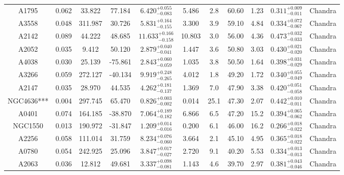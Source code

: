 \documentclass{aa}   %
\begin{document}
\begin{table}[ht!]
\begin{center}
\begin{tabular}{ c  c  c  c c c c c c c c }
A1795               		&		0.062	&	33.822	&	77.184	& $	6.420^{+0.055}_{-0.083}$  &      5.486	&  2.8	&	60.60	&	1.23	&	$ 0.311^{+0.009}_{-0.011}  $ &	  Chandra     \\
A3558               		&		0.048	&	311.987	&	30.726	& $	5.831^{+0.164}_{-0.155}$  &      3.300	&  3.9	&	59.10	&	4.84	&	$ 0.334^{+0.072}_{-0.067}  $ &	 Chandra      \\
A2142               		&		0.089	&	44.222	&	48.685	& $ 11.633^{+0.166}_{-0.158}$ &     10.803	&  3.0	&	56.00	&	4.36	&	$ 0.473^{+0.032}_{-0.033}  $ &	  Chandra     \\
A2052               		&		0.035	&	9.412	&	50.120	& $	2.879^{+0.040}_{-0.041}$  &      1.447	&  3.6	&	50.80	&	3.03	&	$ 0.430^{+0.021}_{-0.020}  $ &	  Chandra     \\
A4038               		&		0.030	&	25.139	&	-75.861	& $	2.843^{+0.060}_{-0.059}$  &      1.035	&  3.8	&	50.50	&	1.64	&	$ 0.398^{+0.031}_{-0.029}  $ &	  Chandra     \\
A3266               		&		0.059	&	272.127	&	-40.134	& $	9.919^{+0.248}_{-0.265}$  &      4.012	&  1.8	&	49.20	&	1.72	&	$ 0.340^{+0.055}_{-0.049}  $ &	  Chandra     \\
A2147               		&		0.035	&	28.970	&	44.535	& $	4.262^{+0.181}_{-0.137}$  &      1.369	&  7.0	&	47.90	&	3.38	&	$ 0.420^{+0.051}_{-0.058}  $ &	  Chandra     \\
NGC4636***          		&		0.004	&	297.745	&	65.470	& $	0.826^{+0.003}_{-0.002}$  &      0.014	&  25.1	&	47.30	&	2.07	&	$ 0.442^{+0.010}_{-0.011}  $ &	  Chandra     \\
A0401               		&		0.074	&	164.185	&	-38.870	& $	7.064^{+0.189}_{-0.182}$  &      6.866	&  6.5	&	47.20	&	15.2	&	$ 0.394^{+0.065}_{-0.062}  $ &	 Chandra      \\
NGC1550             		&		0.013	&	190.972	&	-31.847	& $	1.209^{+0.014}_{-0.016}$  &      0.200	&  6.1	&	46.00	&	16.2	&	$ 0.266^{+0.018}_{-0.022}  $ &	 Chandra      \\
A2256               		&		0.058	&	111.014	&	31.759	& $	8.234^{+0.076}_{-0.060}$  &      3.664	&  2.1	&	45.10	&	4.95	&	$ 0.365^{+0.018}_{-0.022}  $ &	  Chandra     \\
A0780               		&		0.054	&	242.925	&	25.096	& $	3.847^{+0.017}_{-0.027}$  &      2.720	&  9.1	&	40.20	&	5.53	&	$ 0.334^{+0.013}_{-0.013}  $ &	  Chandra     \\
A2063               		&		0.036	&	12.812	&	49.681	& $	3.337^{+0.098}_{-0.081}$  &      1.143	&  4.6	&	39.70	&	2.97	&	$ 0.381^{+0.043}_{-0.046}  $ &	  Chandra     \\

\end{tabular}
\end{center}
\end{table}
\end{document}
